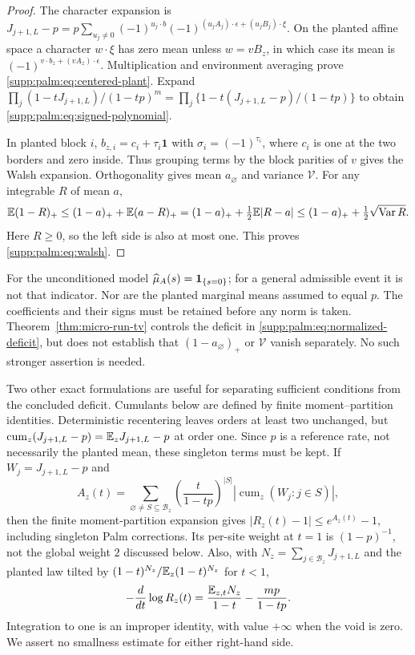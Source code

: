 \begin{proof}
The character expansion is
$J_{j+1,L}-p=p\sum_{u_j\ne0}(-1)^{u_j\cdot b}
 (-1)^{(u_jA_j)\cdot\epsilon+(u_jB_j)\cdot\xi}$.
On the planted affine space a character $w\cdot\xi$ has zero mean unless
$w=vB_z$, in which case its mean is
$(-1)^{v\cdot b_z+(vA_z)\cdot\epsilon}$.
Multiplication and environment averaging prove \eqref{supp:palm:eq:centered-plant}.
Expand
$\prod_j(1-tJ_{j+1,L})/(1-tp)^m
 =\prod_j\{1-t(J_{j+1,L}-p)/(1-tp)\}$ to obtain
\eqref{supp:palm:eq:signed-polynomial}.

In planted block $i$, $b_{z,i}=c_i+\tau_i\mathbf1$ with
$\sigma_i=(-1)^{\tau_i}$, where $c_i$ is one at the two borders and zero inside. Thus grouping terms by the block parities of $v$ gives the Walsh expansion. Orthogonality gives mean $a_\varnothing$ and variance $\mathcal V$.
For any integrable $R$ of mean $a$,
\[
 \mathbb E(1-R)_+\le(1-a)_++\mathbb E(a-R)_+
       =(1-a)_++\tfrac12\mathbb E|R-a|
       \le(1-a)_++\tfrac12\sqrt{\operatorname{Var} R}.
\]
Here $R\ge0$, so the left side is also at most one. This proves \eqref{supp:palm:eq:walsh}.
\end{proof}
For the unconditioned model $\widehat\mu_A(s)=\mathbf 1_{\{s=0\}}$; for a general admissible event it is not that indicator. Nor are the planted marginal means assumed to equal $p$. The coefficients and their signs must be retained before any norm is taken. Theorem~\ref{thm:micro-run-tv} controls the deficit in \eqref{supp:palm:eq:normalized-deficit}, but does not establish that
$(1-a_\varnothing)_+$ or $\mathcal V$ vanish separately. No such stronger assertion is needed.

Two other exact formulations are useful for separating sufficient conditions from the concluded deficit.
Cumulants below are defined by finite moment--partition identities.
Deterministic recentering leaves orders at least two unchanged, but
$\operatorname{cum}_z(J_{j+1,L}-p)=\mathbb E_zJ_{j+1,L}-p$ at order one.
Since $p$ is a reference rate, not necessarily the planted mean, these
singleton terms must be kept. If $W_j=J_{j+1,L}-p$ and
\[
 A_z(t)=\sum_{\varnothing\ne S\subseteq\mathcal B_z}
       \left(\frac{t}{1-tp}\right)^{|S|}
         |\operatorname{cum}_z(W_j:j\in S)|,
\]
then the finite moment-partition expansion gives
$|R_z(t)-1|\le e^{A_z(t)}-1$, including singleton Palm corrections.
Its per-site weight at $t=1$ is $(1-p)^{-1}$, not the global weight $2$ discussed below.
Also, with $N_z=\sum_{j\in\mathcal B_z}J_{j+1,L}$ and the planted law tilted by
$(1-t)^{N_z}/\mathbb E_z(1-t)^{N_z}$ for $t<1$,
\[
 -\frac{d}{dt}\log R_z(t)
     =\frac{\mathbb E_{z,t}N_z}{1-t}-\frac{mp}{1-tp}.
\]
Integration to one is an improper identity, with value $+\infty$ when the void is zero. We assert no smallness estimate for either right-hand side.

